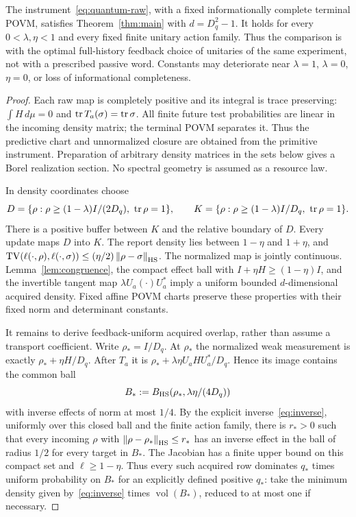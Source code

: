 \begin{theorem}\label{thm:quantum}
The instrument~\eqref{eq:quantum-raw}, with a fixed informationally complete terminal POVM, satisfies Theorem~\ref{thm:main} with $d=D_q^2-1$. It holds for every $0<\lambda,\eta<1$ and every fixed finite unitary action family. Thus the comparison is with the optimal full-history feedback choice of unitaries of the same experiment, not with a prescribed passive word. Constants may deteriorate near $\lambda=1$, $\lambda=0$, $\eta=0$, or loss of informational completeness.
\end{theorem}
\begin{proof}
Each raw map is completely positive and its integral is trace preserving: $\int H\,d\mu=0$ and $\operatorname{tr} T_a(\sigma)=\operatorname{tr}\sigma$. All finite future test probabilities are linear in the incoming density matrix; the terminal POVM separates it. Thus the predictive chart and unnormalized closure are obtained from the primitive instrument. Preparation of arbitrary density matrices in the sets below gives a Borel realization section. No spectral geometry is assumed as a resource law.

In density coordinates choose
\[
 D=\{\rho:\rho\ge(1-\lambda)I/(2D_q),\ \tr\rho=1\},\qquad
 K=\{\rho:\rho\ge(1-\lambda)I/D_q,\ \tr\rho=1\}.
\]
There is a positive buffer between $K$ and the relative boundary of $D$. Every update maps $D$ into $K$. The report density lies between $1-\eta$ and $1+\eta$, and
$\operatorname{TV}(\ell(\cdot,\rho),\ell(\cdot,\sigma))\le(\eta/2)\left\lVert\rho-\sigma\right\rVert_{\mathrm{HS}}$.
The normalized map is jointly continuous. Lemma~\ref{lem:congruence}, the compact effect ball with $I+\eta H\ge(1-\eta)I$, and the invertible tangent map $\lambda U_a(\cdot)U_a^*$ imply a uniform bounded $d$-dimensional acquired density. Fixed affine POVM charts preserve these properties with their fixed norm and determinant constants.

It remains to derive feedback-uniform acquired overlap, rather than assume a transport coefficient. Write $\rho_* = I/D_q$. At $\rho_*$ the normalized weak measurement is exactly
$\rho_*+\eta H/D_q$. After $T_a$ it is $\rho_*+\lambda\eta U_aHU_a^*/D_q$. Hence its image contains the common ball
\[
 B_*:=B_{\mathrm{HS}}(\rho_*,\lambda\eta/(4D_q))
\]
with inverse effects of norm at most $1/4$. By the explicit inverse~\eqref{eq:inverse}, uniformly over this closed ball and the finite action family, there is $r_*>0$ such that every incoming $\rho$ with $\left\lVert\rho-\rho_*\right\rVert_{\mathrm{HS}}\le r_*$ has an inverse effect in the ball of radius $1/2$ for every target in $B_*$. The Jacobian has a finite upper bound on this compact set and $\ell\ge1-\eta$. Thus every such acquired row dominates $q_*$ times uniform probability on $B_*$ for an explicitly defined positive $q_*$: take the minimum density given by~\eqref{eq:inverse} times $\operatorname{vol}(B_*)$, reduced to at most one if necessary.


\end{proof}

